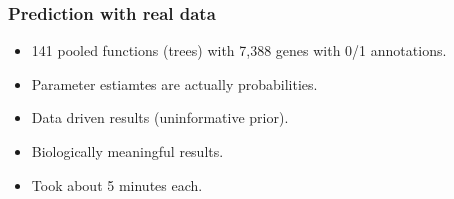 \documentclass[aspectratio=169, 9pt]{beamer}\usepackage[]{graphicx}\usepackage[]{color}
\begin{document}
\begin{frame}[t]
\frametitle{Prediction with real data}

\begin{minipage}{.39\linewidth}
\begin{table}[ht]
\centering
{}
\caption{Parameter estimates using different priors.} 
\end{table}
%
\end{minipage}
\begin{minipage}{.59\linewidth}
\begin{itemize}[<+->]
\item 141 pooled functions (trees) with 7,388 genes with 0/1 annotations.
\item Parameter estiamtes are actually probabilities.
\item Data driven results (uninformative prior).
\item \textcolor{usccardinal}{Biologically meaningful results.}
\item Took about 5 minutes each.
\end{itemize}
\end{minipage}

\end{frame}
\end{document}
